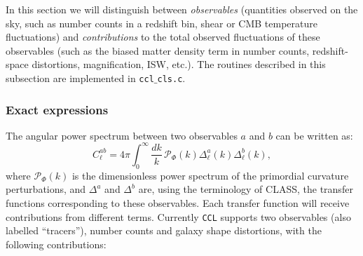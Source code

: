 \documentclass[\docopts]{\docclass}
\newcommand{\ccl}{{\tt CCL}\xspace}
\begin{document}
In this section we will distinguish between {\sl observables} (quantities observed on the sky, such as number counts in a redshift bin, shear or CMB temperature fluctuations) and {\sl contributions} to the total observed fluctuations of these observables (such as the biased matter density term in number counts, redshift-space distortions, magnification, ISW, etc.).
The routines described in this subsection are implemented in {\tt ccl$\_$cls.c}.

\subsubsection{Exact expressions}
The angular power spectrum between two observables $a$ and $b$ can be written as:
\begin{equation}
 C^{ab}_\ell=4\pi\int_0^\infty \frac{dk}{k}\,\mathcal{P}_\Phi(k)\Delta^a_\ell(k)\Delta^b_\ell(k),
\end{equation}
where $\mathcal{P}_\Phi(k)$ is the dimensionless power spectrum of the primordial curvature perturbations, and $\Delta^a$ and $\Delta^b$ are, using the terminology of CLASS, the transfer functions corresponding to these observables. Each transfer function will receive contributions from different terms. Currently \ccl supports two observables (also labelled ``tracers''), number counts and galaxy shape distortions, with the following contributions:
\end{document}
